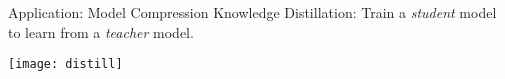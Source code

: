 \begin{frame}{Application: Model Compression}
 Knowledge Distillation: Train a \textit{student} model to learn
from a \textit{teacher} model. %

\begin{center}
  \texttt{[image: distill]}
\end{center}






\end{frame}









